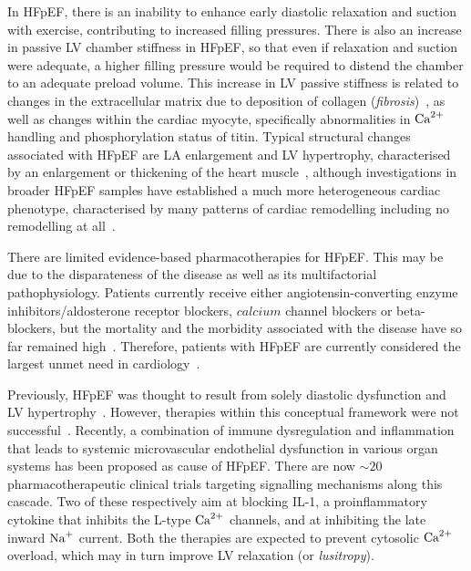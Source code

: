 \vspace{0.2cm}
In HFpEF, there is an inability to enhance early diastolic relaxation and suction with exercise, contributing to increased filling pressures. There is also an increase in passive LV chamber stiffness in HFpEF, so that even if relaxation and suction were adequate, a higher filling pressure would be required to distend the chamber to an adequate preload volume. This increase in LV passive stiffness is related to changes in the extracellular matrix due to deposition of collagen (\textit{fibrosis})~\cite{Burlew:2002}, as well as changes within the cardiac myocyte, specifically abnormalities in $\textrm{Ca}^{2+}$ handling and phosphorylation status of titin. Typical structural changes associated with HFpEF are LA enlargement and LV hypertrophy, characterised by an enlargement or thickening of the heart muscle~\cite{Zile:2004}, although investigations in broader HFpEF samples have established a much more heterogeneous cardiac phenotype, characterised by many patterns of cardiac remodelling including no remodelling at all~\cite{Shah:2012}.

\vspace{0.2cm}
There are limited evidence-based pharmacotherapies for HFpEF. This may be due to the disparateness of the disease as well as its multifactorial pathophysiology. Patients currently receive either angiotensin-converting enzyme inhibitors/aldosterone receptor blockers, $calcium$ channel blockers or beta-blockers, but the mortality and the morbidity associated with the disease have so far remained high~\cite{Adamczak:2020}. Therefore, patients with HFpEF are
currently considered the largest unmet need in cardiology~\cite{Owan:2006}.

\vspace{0.2cm}
Previously, HFpEF was thought to result from solely diastolic dysfunction and LV hypertrophy~\cite{Patel:2019}. However, therapies within this conceptual framework were not successful~\cite{Cleland:2014}. Recently, a combination of immune dysregulation and inflammation that leads to systemic microvascular endothelial dysfunction in various organ systems has been proposed as cause of HFpEF. There are now $\sim 20$ pharmacotherapeutic clinical trials targeting signalling mechanisms along this cascade. Two of these respectively aim at blocking IL-1, a proinflammatory cytokine that inhibits the L-type $\textrm{Ca}^{2+}$ channels, and at inhibiting the late inward $\textrm{Na}^{+}$ current. Both the therapies are expected to prevent cytosolic $\textrm{Ca}^{2+}$ overload, which may in turn improve LV relaxation (or \textit{lusitropy}).

